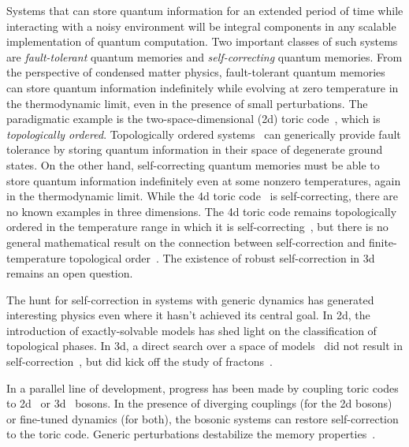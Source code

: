 Systems that can store quantum information for an extended period of time while interacting with a noisy environment will be integral components in any scalable implementation of quantum computation. Two important classes of such systems are \emph{fault-tolerant} quantum memories and \emph{self-correcting} quantum memories. From the perspective of condensed matter physics, fault-tolerant quantum memories can store quantum information indefinitely while evolving at zero temperature in the thermodynamic limit, even in the presence of small perturbations. The paradigmatic example is the two-space-dimensional (2d) toric code~\cite{Kitaev2003Fault}, which is \emph{topologically ordered}. Topologically ordered systems~\cite{Wen1990Topological} can generically provide fault tolerance by storing quantum information in their space of degenerate ground states. On the other hand, self-correcting quantum memories must be able to store quantum information indefinitely even at some nonzero temperatures, again in the thermodynamic limit. While the 4d toric code~\cite{Dennis2002Topological} is self-correcting, there are no known examples in three dimensions. The 4d toric code remains topologically ordered in the temperature range in which it is self-correcting~\cite{Hastings2011Topological}, but there is no general mathematical  result on the connection between self-correction and finite-temperature topological order~\cite{RobertsBartlett2020}. The existence of robust self-correction in 3d remains an open question.

The hunt for self-correction in systems with generic dynamics has generated interesting physics even where it hasn't achieved its central goal. In 2d, the introduction of exactly-solvable models has shed light on the classification of topological phases. In 3d, a direct search over a space of models~\cite{Haah2011Code} did not result in self-correction~\cite{Siva2017Marginally, PremHaahNandkishore2017}, but did kick off the study of fractons~\cite{Vijay2016Fracton, NandkishoreHermele2019, Pretko2020Fracton}. 

In a parallel line of development, progress has been made by coupling toric codes to 2d~\cite{Hamma2009Toric} or 3d~\cite{Pedrocchi2013Thermal} bosons. In the presence of diverging couplings (for the 2d bosons) or fine-tuned dynamics (for both), the bosonic systems can restore self-correction to the toric code. Generic perturbations destabilize the memory properties~\cite{LandonCardinal2015}. 

